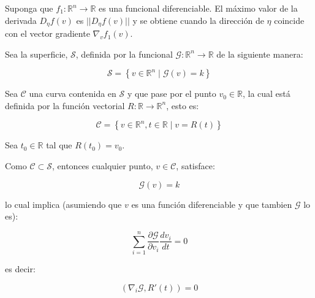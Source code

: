                \begin{teorema}
                    Suponga que $f_1: \mathbb{R}^n \to \mathbb{R}$ es una funcional diferenciable. El máximo valor de la derivada $D_{\eta}f(v)$ es $||D_{\eta}f(v)||$ y se obtiene cuando la dirección de $\eta$ coincide con el vector gradiente $\nabla_v f_1(v)$.
                \end{teorema}

                Sea la superficie, $\mathscr{S}$, definida por la funcional $\mathscr{G}:\mathbb{R}^n \to \mathbb{R}$ de la siguiente manera:

                \begin{equation}
                    \mathscr{S} = \left\{ v \in \mathbb{R}^n \mid \mathscr{G}(v) = k \right\}
                \end{equation}

                Sea $\mathscr{C}$ una curva contenida en $\mathscr{S}$ y que pase por el punto $v_0 \in \mathbb{R}$, la cual está definida por la función vectorial $R: \mathbb{R} \to \mathbb{R}^n$, esto es:

                \begin{equation}
                    \mathscr{C} = \left\{ v \in \mathbb{R}^n, t \in \mathbb{R} \mid v = R(t)\right\}
                \end{equation}

                Sea $t_0 \in \mathbb{R}$ tal que $R(t_0) = v_0$.

                Como $\mathscr{C} \subset \mathscr{S}$, entonces cualquier punto, $v \in \mathscr{C}$, satisface:

                \begin{equation*}
                    \mathscr{G}(v) = k
                \end{equation*}

                lo cual implica (asumiendo que $v$ es una función diferenciable y que tambien $\mathscr{G}$ lo es):

                \begin{equation*}
                    \sum_{i=1}^n \frac{\partial \mathscr{G}}{\partial v_i} \frac{d v_i}{dt} = 0
                \end{equation*}

                es decir:

                \begin{equation*}
                    \left( \nabla_i \mathscr{G}, R'(t) \right) = 0
                \end{equation*}

